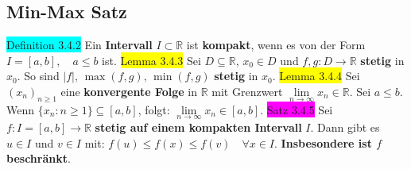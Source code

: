 \documentclass[landscape, 10pt]{article}
\newcommand{\R}{\mathbb{R}}
\begin{document}
\begin{multicols}{3}
       \subsection{Min-Max Satz}
              \colorbox{cyan}{Definition 3.4.2} Ein \textbf{Intervall} $I\subset\R$ ist 
                     \textbf{kompakt}, wenn es 
                     von der Form \textcolor{NavyBlue}{$I=[a,b],\quad a\leqslant b$} ist.
              \colorbox{yellow}{Lemma 3.4.3} Sei \textcolor{NavyBlue}{$D\subseteq\R,\,x_0\in D$} und 
                     \textcolor{NavyBlue}{$f,g:D\longrightarrow\R$} 
                     \textbf{stetig} in \textcolor{NavyBlue}{$x_0$}. So sind 
                     \textcolor{NavyBlue}{
                     $|f|,\,\max(f,g),\,\min(f,g)$} \textbf{stetig} in \textcolor{NavyBlue}{$x_0$}.
              \colorbox{yellow}{Lemma 3.4.4} Sei \textcolor{NavyBlue}{$(x_n)_{n\geqslant1}$}
                     eine \textbf{konvergente Folge} in 
                     $\R$ mit Grenzwert 
                     \textcolor{NavyBlue}{$\lim\limits_{n\to\infty}x_n\in\R$}. 
                     Sei \textcolor{NavyBlue}{$a\leqslant b$}. 
                     Wenn \textcolor{NavyBlue}{$\{x_n:n\geqslant1\}\subseteq[a,b]$}, folgt: 
                     \textcolor{NavyBlue}{$\lim\limits_{n\to\infty}x_n\in[a,b]$}. 
              \colorbox{magenta}{Satz 3.4.5} Sei \textcolor{NavyBlue}{$f:I=[a,b]\longrightarrow\R$}
                     \textbf{stetig auf einem kompakten Intervall} \textcolor{NavyBlue}{$I$}. 
                     Dann gibt es \textcolor{NavyBlue}{$u\in I$} und 
                     \textcolor{NavyBlue}{$v\in I$} mit: 
                     \textcolor{NavyBlue}{$f(u)\leqslant f(x)\leqslant f(v)\quad\forall x\in I$}. 
                     \textbf{Insbesondere ist \textcolor{NavyBlue}{$f$} beschränkt}.

\end{multicols}
\end{document}
